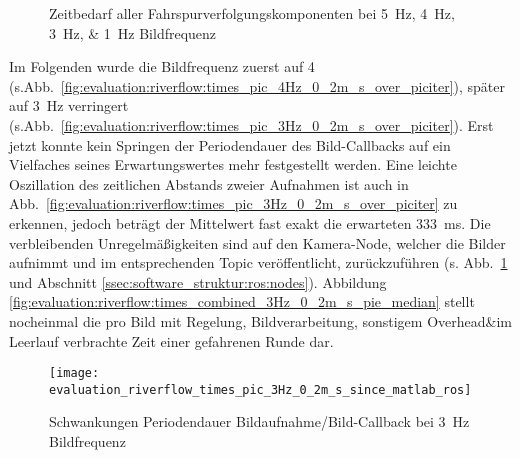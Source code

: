 \begin{figure}[htbp] %
\centering
{}
\hfill
{}
\hfill
{}
\hfill
{}
\caption{Zeitbedarf aller Fahrspurverfolgungskomponenten bei \SIlist{5;4;3;1}{\hertz} Bildfrequenz}
\end{figure}

Im Folgenden wurde die Bildfrequenz zuerst auf 4 (s.Abb.~\ref{fig:evaluation:riverflow:times_pic_4Hz_0_2m_s_over_piciter}), später auf \SI{3}{\hertz} verringert (s.Abb.~\ref{fig:evaluation:riverflow:times_pic_3Hz_0_2m_s_over_piciter}). Erst jetzt konnte kein Springen der Periodendauer des Bild-Callbacks auf ein Vielfaches seines Erwartungswertes mehr festgestellt werden. Eine leichte Oszillation des zeitlichen Abstands zweier Aufnahmen ist auch in Abb.~\ref{fig:evaluation:riverflow:times_pic_3Hz_0_2m_s_over_piciter} zu erkennen, jedoch beträgt der Mittelwert fast exakt die erwarteten \SI{333}{ms}. Die verbleibenden Unregelmäßigkeiten sind auf den Kamera-Node, welcher die Bilder aufnimmt und im entsprechenden Topic veröffentlicht, zurückzuführen (s. Abb.~\ref{fig:evaluation:riverflow:times_pic_3Hz_0_2m_s_since_matlab_ros} und Abschnitt \ref{ssec:software_struktur:ros:nodes}). Abbildung \ref{fig:evaluation:riverflow:times_combined_3Hz_0_2m_s_pie_median} 
stellt nocheinmal die pro Bild mit Regelung, Bildverarbeitung, sonstigem Overhead\&im Leerlauf verbrachte Zeit einer gefahrenen Runde dar.

\begin{figure}[htbp]
	\centering
		\texttt{[image: evaluation\_riverflow\_times\_pic\_3Hz\_0\_2m\_s\_since\_matlab\_ros]}
		\label{fig:evaluation:riverflow:times_pic_3Hz_0_2m_s_since_matlab_ros}
		\caption{Schwankungen Periodendauer Bildaufnahme/Bild-Callback bei \SI{3}{\hertz} Bildfrequenz}
\end{figure}

